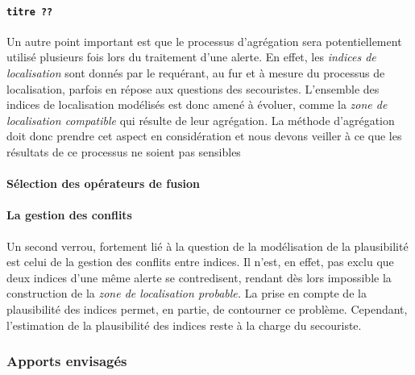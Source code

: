 \paragraph{\texttt{titre ??}}


Un autre point important est que le processus d'agrégation sera
potentiellement utilisé plusieurs fois lors du traitement d'une
alerte. En effet, les \emph{indices de localisation} sont donnés par
le requérant, au fur et à mesure du processus de localisation, parfois
en répose aux questions des secouristes. L'ensemble des indices de
localisation modélisés est donc amené à évoluer, comme la \emph{zone
  de localisation compatible} qui résulte de leur agrégation. La
méthode d’agrégation doit donc prendre cet aspect en considération et
nous devons veiller à ce que les résultats de ce processus ne soient
pas sensibles


\paragraph{Sélection des opérateurs de fusion}


\paragraph{La gestion des conflits}


Un second verrou, fortement lié à la question de la modélisation de la
plausibilité est celui de la gestion des conflits entre indices. Il
n'est, en effet, pas exclu que deux indices d'une même alerte se
contredisent, rendant dès lors impossible la construction de la
\emph{zone de localisation probable.} La prise en compte de la
plausibilité des indices permet, en partie, de contourner ce
problème. Cependant, l'estimation de la plausibilité des indices reste
à la charge du secouriste.

\subsubsection{Apports envisagés}

